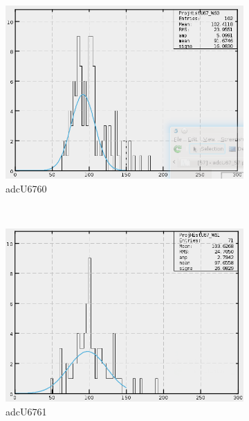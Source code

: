 \begin{figure}[h]
\begin{subfigure}[h]{0.3\textwidth}
        \includegraphics[width=\textwidth, keepaspectratio = true]{adcU67_60}
        \caption{adcU6760}
        \label{fig:adcU67_60}
    \end{subfigure}
    ~
    \begin{subfigure}[h]{0.3\textwidth}
        \centering
        \includegraphics[width=\textwidth, keepaspectratio = true]{adcU67_61}
        \caption{adcU6761}
        \label{fig:adcU67_61}
    \end{subfigure}
    \\
    \begin{subfigure}[h]{0.3\textwidth}
        \centering

\end{subfigure}
\end{figure}
